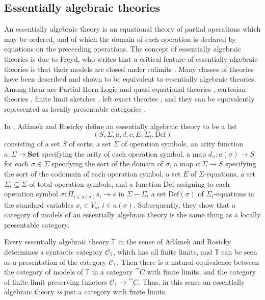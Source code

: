 \documentclass{article}
\begin{document}
\subsection*{Essentially algebraic theories}
An essentially algebraic theory is an equational theory of partial operations
which may be ordered, and of which the domain of each operation is declared by 
equations on the preceeding operations. The concept of essentially algebraic
theories is due to Freyd, who writes that a critical feature of essentially
algebraic theories is that their models are closed under 
colimits \cite{Aspects_of_topoi}. Many classes of theories have been described
and shown to be equivalent to essentially algebraic theories. Among them are
Partial Horn Logic and quasi-equational theories \cite{Palmgren_Vickers},
cartesian theories \cite{Freyd2002}, finite limit sketches 
\cite{Toposes_triples_theories}, left exact theories
\cite{McLarty1986}, and they can be equivalently represented as locally
presentable categories \cite{Adamek_Locally}.

In \cite{Adamek_Locally}, Ad\'amek and Rosicky
define an essentially algebraic theory to be a list 
\begin{equation*}
(S,\Sigma,a,d,c,E,\Sigma_t,\mathrm{Def})
\end{equation*} 
consisting of a set $S$ of sorts, a set $\Sigma$ of operation symbols,
an arity function $a:\Sigma\to\mathbf{Set}$ specifying the arity of each operation
symbol, a map $d_\sigma:a(\sigma)\to S$
for each $\sigma\in\Sigma$ specifying the sort of the domain of $\sigma$,
a map $c:\Sigma\to S$ specifying the sort of the codomain of each operation
symbol,
a set $E$ of $\Sigma$-equations, a set $\Sigma_t\subseteq\Sigma$ of total
operation symbols, and a function $\mathrm{Def}$ assigning to each operation
symbol $\sigma:\Pi_{i\in a(\sigma)} s_i\to s$ in $\Sigma-\Sigma_t$ a set
$\mathrm{Def}(\sigma)$ of $\Sigma_t$-equations in the standard variables
$x_i\in V_s$, $i\in a(\sigma)$. Subsequently, they show that a category of models of an
essentially algebraic theory is the same thing as a locally presentable 
category.

Every essentially algebraic theory $\mathbb{T}$ in the sense of Ad\'amek and Rosicky
determines a syntactic category $\mathcal{C}_\mathbb{T}$, which has all finite
limits, and $\mathbb{T}$ can be seen as a presentation of the category
$\mathcal{C}_\mathbb{T}$. Then there is a natural equivalence between the
category of models of $\mathbb{T}$ in a category $\cat{C}$ with finite limits,
and the category of finite limit preserving functors $\mathcal{C}_\mathbb{T}\to
\cat{C}$. Thus, in this sense an essentially algebraic theory \emph{is} just
a category with finite limits. 
\end{document}
